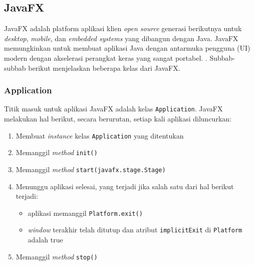 \subsection{JavaFX}
\label{sec:javafx}
JavaFX adalah platform aplikasi klien \textit{open source} generasi berikutnya untuk \textit{desktop}, \textit{mobile}, dan \textit{embedded systems} yang dibangun dengan Java. JavaFX memungkinkan untuk membuat aplikasi Java dengan antarmuka pengguna (UI) modern dengan akselerasi perangkat keras yang sangat portabel. \cite{javafx}. Subbab-subbab berikut menjelaskan beberapa kelas dari JavaFX. \cite{javafx}


\subsubsection{Application}
\label{application}
Titik masuk untuk aplikasi JavaFX adalah kelas \texttt{Application}. JavaFX melakukan hal berikut, secara berurutan, setiap kali aplikasi diluncurkan:
\begin{enumerate}
    \item Membuat \textit{instance} kelas \texttt{Application} yang ditentukan
    \item Memanggil \textit{method} \texttt{init()}
    \item Memanggil \textit{method} \texttt{start(javafx.stage.Stage)}
    \item Menunggu aplikasi selesai, yang terjadi jika salah satu dari hal berikut terjadi:
    \begin{itemize}
        \item aplikasi memanggil \texttt{Platform.exit()}
        \item \textit{window} terakhir telah ditutup dan atribut \texttt{implicitExit} di \texttt{Platform} adalah true    
    \end{itemize}
    \item Memanggil \textit{method} \texttt{stop()}
\end{enumerate}

